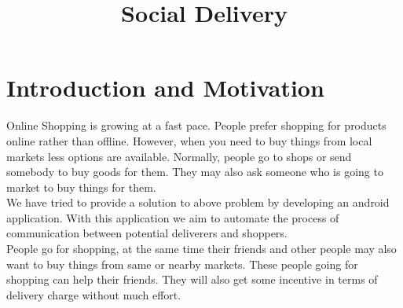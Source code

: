 \documentclass{report}
\begin{document}

{ \doublespacing
{}
\tableofcontents %

\pagebreak
\listoffigures %
\pagebreak

}

\title{\fontsize{45}{66.6}\selectfont  Social Delivery\linebreak}
\date{}
\maketitle
\setlength{\columnsep}{0.7cm}


\chapter{Introduction and Motivation}
\bigskip
\bigskip
\par \Large Online Shopping is growing at a fast pace. People prefer shopping for products online rather than offline. However, when you need to buy things from local markets less options are available. Normally, people go to shops or send somebody to buy goods for them. They may also ask someone who is going to market to buy things for them.\\

We have tried to provide a solution to above problem by developing an android application. With this application we aim to automate the process of communication between potential deliverers and shoppers.\\


People go for shopping, at the same time their friends and other people may also want to buy things from same or nearby markets. These people going for shopping can help their friends. They will also get some incentive in terms of delivery charge without much effort.\\
\end{document}
